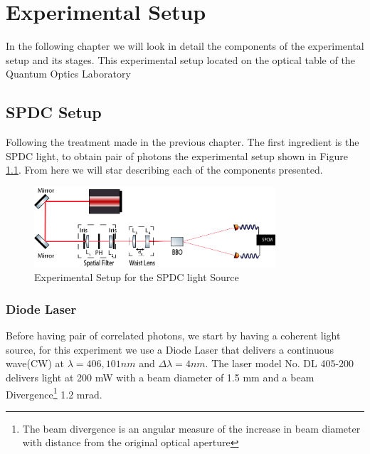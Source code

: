 
\chapter{Experimental Setup} %

\label{Chapter3} %
In the following chapter we will look in detail the components of the experimental 
setup and its stages. This experimental setup located on the optical table of the 
Quantum Optics Laboratory
\section{SPDC Setup}
Following the treatment made in the previous chapter. The first ingredient is the SPDC light, to obtain pair of photons
 the experimental setup shown in Figure \ref{fig:SPDC}. From here we will star describing each of the components
presented.


\begin{figure}[h!]
\centering
\includegraphics[width=0.8\textwidth]{Figures/SPDC.png}
\caption{Experimental Setup for the SPDC light Source} 
\label{fig:SPDC}
\end{figure}

\subsection{Diode Laser}
Before having pair of correlated photons, we start by having a coherent light source, 
for this experiment we use a Diode Laser that delivers a continuous wave(CW) at 
$\lambda = 406,101 nm$ and $\Delta \lambda = 4 nm$. 
The laser model No. DL 405-200 delivers light at 200 mW with a beam diameter 
of 1.5 mm and a beam Divergence\footnote{The beam divergence is an angular measure of the increase in beam diameter with distance from the original optical aperture}
 1.2 mrad. 

